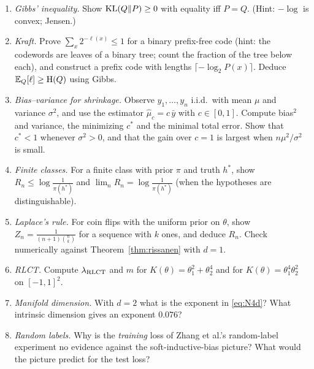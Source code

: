 \begin{exercise}[Problems]
\begin{enumerate}
  \item \emph{Gibbs' inequality.} Show $\operatorname{KL}(Q\|P)\ge0$ with equality iff $P=Q$. (Hint: $-\log$ is convex; Jensen.)
  \item \emph{Kraft.} Prove $\sum_x2^{-\ell(x)}\le1$ for a binary prefix-free code (hint: the codewords are leaves of a binary tree; count the fraction of the tree below each), and construct a prefix code with lengths $\lceil-\log_2P(x)\rceil$. Deduce $\mathbb{E}_Q[\ell]\ge\mathrm{H}(Q)$ using Gibbs.
  \item \emph{Bias--variance for shrinkage.} Observe $y_1,\dots,y_n$ i.i.d.\ with mean $\mu$ and variance $\sigma^2$, and use the estimator $\hat\mu_c=c\,\bar y$ with $c\in[0,1]$. Compute bias$^2$ and variance, the minimizing $c^*$ and the minimal total error. Show that $c^*<1$ whenever $\sigma^2>0$, and that the gain over $c=1$ is largest when $n\mu^2/\sigma^2$ is small.
  \item \emph{Finite classes.} For a finite class with prior $\pi$ and truth $h^*$, show $R_n\le\log\frac1{\pi(h^*)}$ and $\lim_nR_n=\log\frac1{\pi(h^*)}$ (when the hypotheses are distinguishable).
  \item \emph{Laplace's rule.} For coin flips with the uniform prior on $\theta$, show $Z_n=\frac{1}{(n+1)\binom nk}$ for a sequence with $k$ ones, and deduce $R_n$. Check numerically against Theorem~\ref{thm:rissanen} with $d=1$.
  \item \emph{RLCT.} Compute $\lambda_{\mathrm{RLCT}}$ and $m$ for $K(\theta)=\theta_1^2+\theta_2^4$ and for $K(\theta)=\theta_1^4\theta_2^2$ on $[-1,1]^2$.
  \item \emph{Manifold dimension.} With $d=2$ what is the exponent in \eqref{eq:N4d}? What intrinsic dimension gives an exponent $0.076$?
  \item \emph{Random labels.} Why is the \emph{training} loss of Zhang et al.'s random-label experiment no evidence against the soft-inductive-bias picture? What would the picture predict for the test loss?
\end{enumerate}
\end{exercise}
